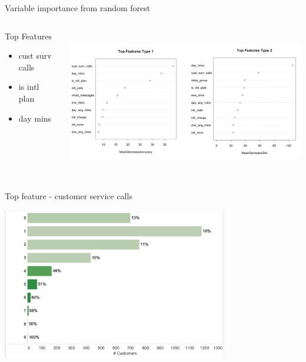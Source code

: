\documentclass[10pt]{beamer}
\begin{document}
    \begin{frame}{Variable importance from random forest}
      \begin{columns}
        \begin{column}{0.38\textwidth}
         \begin{block}{Top Features}
          \smallskip
           \begin{itemize}
             \item cust surv calls
             \smallskip
             \item is intl plan
             \smallskip
             \item day mins
           \end{itemize}
         \end{block}
        \end{column}
        \begin{column}{0.6\textwidth}
          \begin{center}
            \includegraphics[height=180pt]{../graphs/rf_var_importance}
          \end{center}
        \end{column}
      \end{columns}
    \end{frame}

    \begin{frame}{Top feature - customer service calls}
      \begin{center}
        \includegraphics[width=280pt]{../graphs/top_var_cust_surv}
      \end{center}
    \end{frame}
\end{document}
